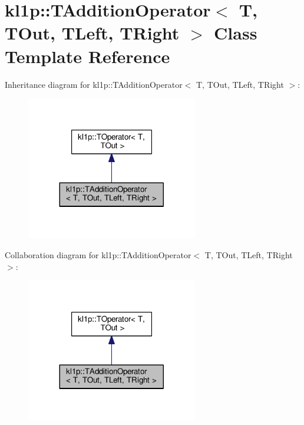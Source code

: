\hypertarget{classkl1p_1_1TAdditionOperator}{}\section{kl1p\+:\+:T\+Addition\+Operator$<$ T, T\+Out, T\+Left, T\+Right $>$ Class Template Reference}
\label{classkl1p_1_1TAdditionOperator}


Inheritance diagram for kl1p\+:\+:T\+Addition\+Operator$<$ T, T\+Out, T\+Left, T\+Right $>$\+:
\nopagebreak
\begin{figure}[H]
\begin{center}
\leavevmode
\includegraphics[width=212pt]{classkl1p_1_1TAdditionOperator__inherit__graph}
\end{center}
\end{figure}


Collaboration diagram for kl1p\+:\+:T\+Addition\+Operator$<$ T, T\+Out, T\+Left, T\+Right $>$\+:
\nopagebreak
\begin{figure}[H]
\begin{center}
\leavevmode
\includegraphics[width=212pt]{classkl1p_1_1TAdditionOperator__coll__graph}
\end{center}
\end{figure}
